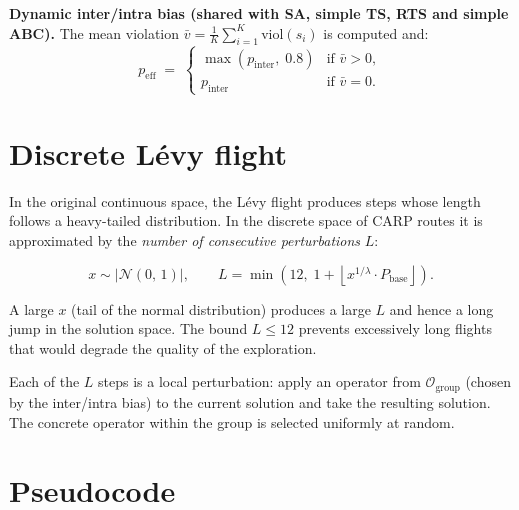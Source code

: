 \documentclass[12pt, a4paper]{article}
\begin{document}
\medskip
\noindent
\textbf{Dynamic inter/intra bias (shared with SA, simple TS, RTS and simple
ABC).} The mean violation
$\bar{v} = \tfrac{1}{K}\sum_{i=1}^{K}\mathrm{viol}(s_i)$ is computed and:
\[
p_{\mathrm{eff}} \;=\;
\begin{cases}
  \max(p_{\mathrm{inter}},\; 0.8) & \text{if } \bar{v} > 0, \\
  p_{\mathrm{inter}}              & \text{if } \bar{v} = 0.
\end{cases}
\]

\section{Discrete L\'evy flight}
\label{sec:levy}

In the original continuous space, the L\'evy flight produces steps whose length
follows a heavy-tailed distribution. In the discrete space of CARP routes it is
approximated by the \emph{number of consecutive perturbations} $L$:

\[
x \sim |\mathcal{N}(0,\,1)|, \qquad
L = \min\!\left(12,\; 1 + \left\lfloor x^{1/\lambda} \cdot P_{\mathrm{base}} \right\rfloor\right).
\]

A large $x$ (tail of the normal distribution) produces a large $L$ and hence a
long jump in the solution space. The bound $L \leq 12$ prevents excessively
long flights that would degrade the quality of the exploration.

Each of the $L$ steps is a local perturbation: apply an operator from
$\mathcal{O}_{\mathrm{group}}$ (chosen by the inter/intra bias) to the current
solution and take the resulting solution. The concrete operator within the
group is selected uniformly at random.

\section{Pseudocode}
\end{document}
